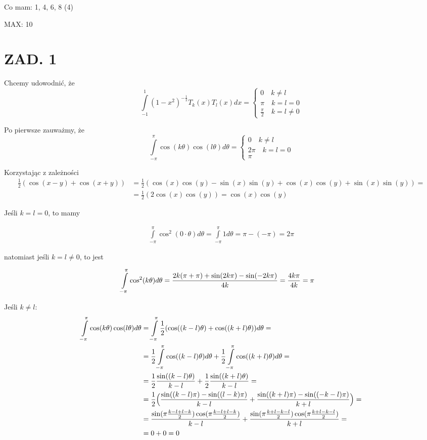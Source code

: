 \documentclass{article}[16pt]
\begin{document}
Co mam: 1, 4, 6, 8 (4)

MAX: 10

\section*{ZAD. 1}

Chcemy udowodnić, że
$$\int\limits_{-1}^1(1-x^2)^{-\frac12}T_k(x)T_l(x)dx=\begin{cases}
    0\quad k\neq l\\
    \pi\quad k=l=0\\
    \frac\pi2\quad k=l\neq 0
\end{cases}$$

Po pierwsze zauważmy, że
$$\int\limits_{-\pi}^\pi \cos(k\theta)\cos(l\theta)d\theta=\begin{cases}
    0\quad k\neq l\\
    2\pi\quad k=l=0\\
    \pi
\end{cases}$$

Korzystając z zależności
\begin{align*}
    \frac12(\cos(x-y)+\cos(x+y))&=\frac12(\cos(x)\cos(y)-\sin(x)\sin(y)+\cos(x)\cos(y)+\sin(x)\sin(y))=\\
    &=\frac12(2\cos(x)\cos(y))=\cos(x)\cos(y)
\end{align*}

Jeśli $k=l=0$, to mamy

\begin{align*}
    \int\limits_{-\pi}^\pi\cos^2(0\cdot\theta)d\theta=\int\limits_{-\pi}^\pi1d\theta=\pi-(-\pi)=2\pi
\end{align*}

natomiast jeśli $k=l\neq0$, to jest

\begin{align*}
    \int\limits_{-\pi}^\pi\cos^2(k\theta)d\theta&={2k(\pi+\pi)+\sin(2k\pi)-\sin(-2k\pi)\over 4k}={4k\pi\over 4k}=\pi
\end{align*}

Jeśli $k\neq l$:
\begin{align*}
    \int\limits_{-\pi}^\pi\cos(k\theta)\cos(l\theta)d\theta&=\int\limits_{-\pi}^\pi\frac12(\cos((k-l)\theta)+\cos((k+l)\theta))d\theta=\\
    &=\frac12\int\limits_{-\pi}^\pi\cos((k-l)\theta)d\theta+\frac12\int\limits_{-\pi}^\pi\cos((k+l)\theta)d\theta=\\
    &=\frac12{\sin((k-l)\theta)\over k-l}+\frac12{\sin((k+l)\theta)\over k-l}=\\
    &=\frac12\Big({\sin((k-l)\pi)-\sin((l-k)\pi)\over k-l}+{\sin((k+l)\pi)-\sin((-k-l)\pi)\over k+l}\Big)=\\
    &={\sin(\pi{k-l+l-k\over2})\cos(\pi{k-l+l-k\over2})\over k-l}+{\sin(\pi{k+l-k-l\over2})\cos(\pi{k+l-k-l\over2})\over k+l}=\\
    &=0+0=0
\end{align*}
\end{document}
